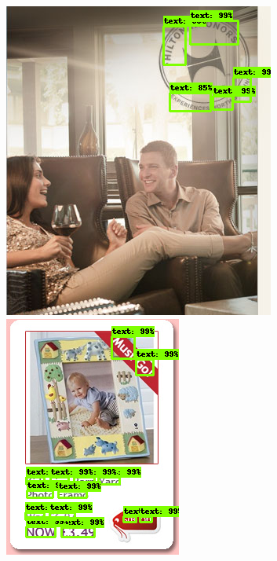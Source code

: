 \begin{figure}[!h]
	\centering

    \includegraphics[height=0.29\textheight]{VISAPP/figs/qualitative-results/icdar11/69.png}
    \includegraphics[height=0.29\textheight]{VISAPP/figs/qualitative-results/icdar11/46.png}
    
    \vspace{1.5mm}
    

\end{figure}
